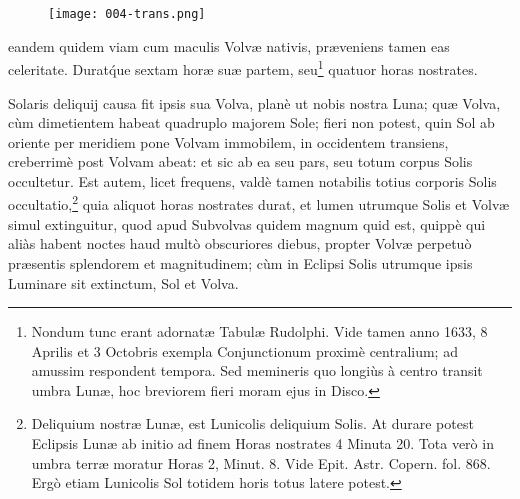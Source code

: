 \documentclass[a4paper, 11pt, oneside, polutonikogreek, german]{article}
\begin{document}
{\begin{figure}[H]
\centering
\texttt{[image: 004-trans.png]}
\end{figure}} eandem quidem viam cum maculis Volvæ nativis, præveniens tamen eas celeritate. Durat\'que sextam horæ suæ partem, seu\footnote{Nondum tunc erant adornatæ Tabulæ Rudolphi. Vide tamen anno 1633, 8 Aprilis et 3 Octobris exempla Conjunctionum proximè centralium; ad amussim respondent tempora. Sed memineris quo longiùs à centro transit umbra Lunæ, hoc breviorem fieri moram ejus in Disco.} quatuor horas nostrates.

Solaris deliquij causa fit ipsis sua Volva, planè ut nobis nostra Luna; quæ Volva, cùm dimetientem habeat quadruplo majorem Sole; fieri non potest, quin Sol ab oriente per meridiem pone Volvam immobilem, in occidentem transiens, creberrimè post Volvam abeat: et sic ab ea seu pars, seu totum corpus Solis occultetur. Est autem, licet frequens, valdè tamen notabilis totius corporis Solis occultatio,\footnote{Deliquium nostræ Lunæ, est Lunicolis deliquium Solis. At durare potest Eclipsis Lunæ ab initio ad finem Horas nostrates 4 Minuta 20. Tota verò in umbra terræ moratur Horas 2, Minut. 8. Vide Epit. Astr. Copern. fol. 868. Ergò etiam Lunicolis Sol totidem horis totus latere potest.} quia aliquot horas nostrates durat, et lumen utrumque Solis et Volvæ simul extinguitur, quod apud Subvolvas quidem magnum quid est, quippè qui aliàs habent noctes haud multò obscuriores diebus, propter Volvæ perpetuò præsentis splendorem et magnitudinem; cùm in Eclipsi Solis utrumque ipsis Luminare sit extinctum, Sol et Volva.
\end{document}
